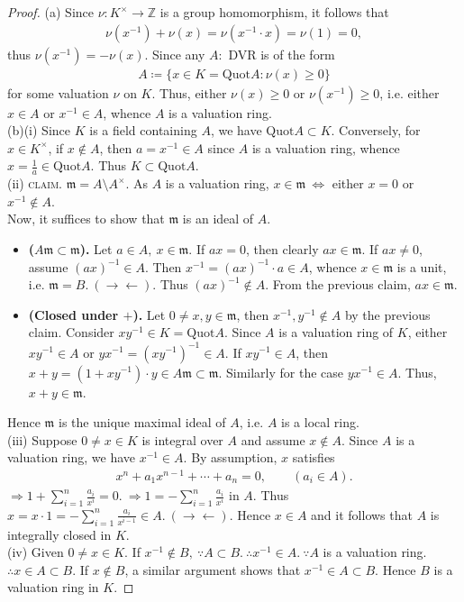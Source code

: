 \documentclass[12pt,a4paper,footinclude=true,headinclude=true]{scrbook} %
\begin{document}
\begin{proof}
    (a) Since $\nu:K^\times\to\mathbb{Z}$ is a group homomorphism, it follows that
    \begin{align*}
        \nu(x^{-1})+\nu(x)=\nu(x^{-1}\cdot x)=\nu(1)=0,
    \end{align*}
    thus $\nu(x^{-1})=-\nu(x)$. Since any $A$:\ DVR is of the form
    \begin{align*}
        A\coloneqq\{x\in K=\mathrm{Quot}A:\nu(x)\geq0\}
    \end{align*}
    for some valuation $\nu$ on $K$. Thus, either $\nu(x)\geq0$ or $\nu(x^{-1})\geq0$, i.e. either $x\in A$ or $x^{-1}\in A$, whence $A$ is a valuation ring.\\
    (b)(i) Since $K$ is a field containing $A$, we have $\mathrm{Quot}A\subset K$. Conversely, for $x\in K^\times$, if $x\notin A$, then $a=x^{-1}\in A$ since $A$ is a valuation ring, whence $x=\frac{1}{a}\in\mathrm{Quot}A$. Thus $K\subset\mathrm{Quot}A$.\\
    (ii) \textsc{claim.} $\mathfrak{m}=A\setminus A^\times$. As $A$ is a valuation ring, $x\in\mathfrak{m}\ \Leftrightarrow$ either $x=0$ or $x^{-1}\notin A$. \\
    Now, it suffices to show that $\mathfrak{m}$ is an ideal of $A$.
    \begin{itemize}
        \item \textbf{($A\mathfrak{m}\subset\mathfrak{m}$).} Let $a\in A,\ x\in\mathfrak{m}$. If $ax=0$, then clearly $ax\in\mathfrak{m}$. If $ax\neq0$, assume $(ax)^{-1}\in A$. Then $x^{-1}=(ax)^{-1}\cdot a\in A$, whence $x\in\mathfrak{m}$ is a unit, i.e. $\mathfrak{m}=B.\ (\to\gets)$. Thus $(ax)^{-1}\notin A$. From the previous claim, $ax\in\mathfrak{m}$.
        \item \textbf{(Closed under $+$).} Let $0\neq x,y\in\mathfrak{m}$, then $x^{-1},y^{-1}\notin A$ by the previous claim. Consider $xy^{-1}\in K=\mathrm{Quot}A$. Since $A$ is a valuation ring of $K$, either $xy^{-1}\in A$ or $yx^{-1}=(xy^{-1})^{-1}\in A$. If $xy^{-1}\in A$, then $x+y=(1+xy^{-1})\cdot y\in A\mathfrak{m}\subset\mathfrak{m}$. Similarly for the case $yx^{-1}\in A$. Thus, $x+y\in\mathfrak{m}$.
    \end{itemize}
    Hence $\mathfrak{m}$ is the unique maximal ideal of $A$, i.e. $A$ is a local ring.\\
    (iii) Suppose $0\neq x\in K$ is integral over $A$ and assume $x\notin A$. Since $A$ is a valuation ring, we have $x^{-1}\in A$. By assumption, $x$ satisfies
    \begin{align*}
        x^n+a_1x^{n-1}+\cdots+a_n=0,\qquad (a_i\in A).
    \end{align*}
    $\Rightarrow 1+\sum_{i=1}^n\frac{a_i}{x^i}=0.\ \Rightarrow 1=-\sum_{i=1}^n\frac{a_i}{x^i}$ in $A$. Thus $x=x\cdot1=-\sum_{i=1}^n\frac{a_i}{x^{i-1}}\in A.\ (\to\gets)$. Hence $x\in A$ and it follows that $A$ is integrally closed in $K$. \\
    (iv) Given $0\neq x\in K$. If $x^{-1}\notin B,\ \because A\subset B.\ \therefore x^{-1}\in A.\ \because A$ is a valuation ring. $\therefore x\in A\subset B$. If $x\notin B$, a similar argument shows that $x^{-1}\in A\subset B$. Hence $B$ is a valuation ring in $K$.
\end{proof}
\end{document}
